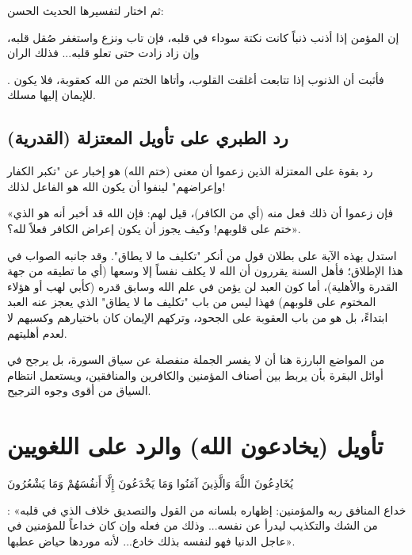 ثم اختار  لتفسيرها الحديث الحسن: \begin{hadith}إن المؤمن إذا أذنب ذنباً كانت نكتة سوداء في قلبه، فإن تاب ونزع واستغفر صُقل قلبه، وإن زاد زادت حتى تعلو قلبه... فذلك الران\end{hadith}. فأثبت أن الذنوب إذا تتابعت أغلقت القلوب، وأتاها الختم من الله كعقوبة، فلا يكون للإيمان إليها مسلك.

\subsection{رد الطبري على تأويل المعتزلة (القدرية)}
رد  بقوة على المعتزلة الذين زعموا أن معنى (ختم الله) هو إخبار عن "تكبر الكفار وإعراضهم" لينفوا أن يكون الله هو الفاعل لذلك! 

 «فإن زعموا أن ذلك فعل منه (أي من الكافر)، قيل لهم: فإن الله قد أخبر أنه هو الذي ختم على قلوبهم! وكيف يجوز أن يكون إعراض الكافر فعلاً لله؟».

\begin{fawaid}
استدل  بهذه الآية على بطلان قول من أنكر "تكليف ما لا يطاق". وقد جانبه الصواب في هذا الإطلاق؛ فأهل السنة يقررون أن الله لا يكلف نفساً إلا وسعها (أي ما تطيقه من جهة القدرة والأهلية)، أما كون العبد لن يؤمن في علم الله وسابق قدره (كأبي لهب أو هؤلاء المختوم على قلوبهم) فهذا ليس من باب "تكليف ما لا يطاق" الذي يعجز عنه العبد ابتداءً، بل هو من باب العقوبة على الجحود، وتركهم الإيمان كان باختيارهم وكسبهم لا لعدم أهليتهم.
\end{fawaid}

\begin{fawaid}
من المواضع البارزة هنا أن  لا يفسر الجملة منفصلة عن سياق السورة، بل يرجح في أوائل البقرة بأن يربط بين أصناف المؤمنين والكافرين والمنافقين، ويستعمل انتظام السياق من أقوى وجوه الترجيح.
\end{fawaid}

\separator

\section{تأويل (يخادعون الله) والرد على اللغويين}
 \begin{ayah}يُخَادِعُونَ اللَّهَ وَالَّذِينَ آمَنُوا وَمَا يَخْدَعُونَ إِلَّا أَنفُسَهُمْ وَمَا يَشْعُرُونَ\end{ayah}: «خداع المنافق ربه والمؤمنين: إظهاره بلسانه من القول والتصديق خلاف الذي في قلبه من الشك والتكذيب ليدرأ عن نفسه... وذلك من فعله وإن كان خداعاً للمؤمنين في عاجل الدنيا فهو لنفسه بذلك خادع... لأنه موردها حياض عطبها».

